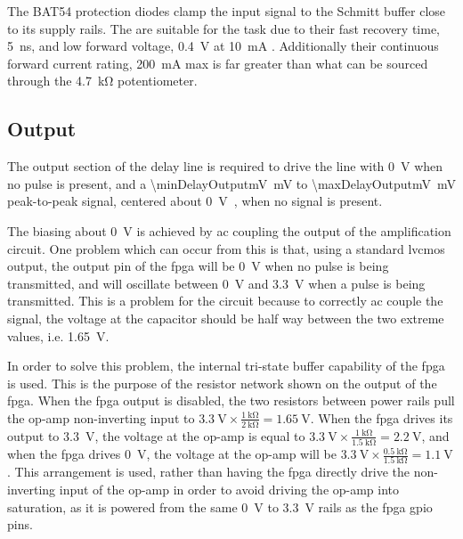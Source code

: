 The BAT54 protection diodes clamp the input signal to the Schmitt buffer close to its supply rails. The are suitable for the task due to their fast recovery time, \SI{5}{\nano\second}, and low forward voltage, \SI{0.4}{\volt} at \SI{10}{\milli\ampere} \cite[p.2]{vishay2013}. Additionally their continuous forward current rating, \SI{200}{\milli\ampere} max is far greater than what can be sourced through the \SI{4.7}{\kilo\ohm} potentiometer.

\subsection{Output} \label{sec:delay-line-ana-output}

The output section of the delay line is required to drive the line with \SI{0}{\volt} when no pulse is present, and a \SI{\minDelayOutputmV}{\milli\volt} to \SI{\maxDelayOutputmV}{\milli\volt} peak-to-peak signal, centered about \SI{0}{\volt,} when no signal is present.


The biasing about \SI{0}{\volt} is achieved by \gls{ac} coupling the output of the amplification circuit. One problem which can occur from this is that, using a standard \gls{lvcmos} output, the output pin of the \gls{fpga} will be \SI{0}{\volt} when no pulse is being transmitted, and will oscillate between \SI{0}{\volt} and \SI{3.3}{\volt} when a pulse is being transmitted. This is a problem for the circuit because to correctly \gls{ac} couple the signal, the voltage at the capacitor should be half way between the two extreme values, i.e. \SI{1.65}{\volt}.

In order to solve this problem, the internal tri-state buffer capability of the \gls{fpga} is used. This is the purpose of the resistor network shown on the output of the \gls{fpga}. When the \gls{fpga} output is disabled, the two resistors between power rails pull the op-amp non-inverting input to $\SI{3.3}{\volt} \times\frac{\SI{1}{\kilo\ohm}}{\SI{2}{\kilo\ohm}} = \SI{1.65}{\volt}$. When the \gls{fpga} drives its output to \SI{3.3}{\volt}, the voltage at the op-amp is equal to $\SI{3.3}{\volt} \times\frac{\SI{1}{\kilo\ohm}}{\SI{1.5}{\kilo\ohm}} = \SI{2.2}{\volt}$, and when the \gls{fpga} drives \SI{0}{\volt}, the voltage at the op-amp will be $\SI{3.3}{\volt} \times\frac{\SI{0.5}{\kilo\ohm}}{\SI{1.5}{\kilo\ohm}} = \SI{1.1}{\volt}$. This arrangement is used, rather than having the \gls{fpga} directly drive the non-inverting input of the op-amp in order to avoid driving the op-amp into saturation, as it is powered from the same \SI{0}{\volt} to \SI{3.3}{\volt} rails as the \gls{fpga} \gls{gpio} pins.

